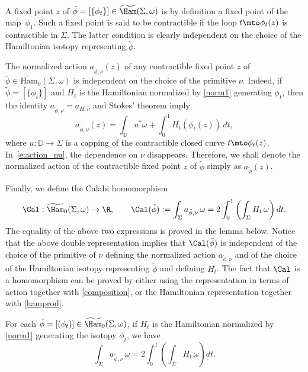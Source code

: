 A fixed point $z$ of $\tilde{\phi}=[\{\phi_t\}]\in \widetilde{\Ham}(\Sigma,\omega)$ is by definition a fixed point of the map~$\phi_1$. Such a fixed point is said to be contractible if the loop $t\mto \phi_t(z)$ is contractible in $\Sigma$. The latter condition is clearly independent on the choice of the Hamiltonian isotopy representing $\tilde{\phi}$.

The normalized action $a_{\tilde{\phi},\nu}(z)$ of any contractible fixed point $z$ of $\tilde{\phi}\in \widetilde{\mathrm{Ham}}_0(\Sigma,\omega)$ is independent on the choice of the primitive $\nu$. Indeed, if $\tilde\phi=[\{\phi_t\}]$ and $H_t$ is the Hamiltonian normalized by \eqref{norm1} generating $\phi_t$, then the identity $a_{\tilde{\phi},\nu}=a_{H,\nu}$ and Stokes' theorem imply
\begin{equation}
\label{e:action_nu}
a_{\tilde{\phi},\nu}(z) = \int_{\mathbb{D}} u^* \omega + \int_0^1 H_t(\phi_t(z))\, dt,
\end{equation}
where $u: \mathbb{D}\to \Sigma$ is a capping of the contractible closed curve $t\mto \phi_t(z)$. In~\eqref{e:action_nu}, the dependence on $\nu$ disappears. Therefore, we shall denote the normalized action of the contractible fixed point $z$ of $\tilde{\phi}$ simply as $a_{\tilde{\phi}}(z)$.

Finally, we define the Calabi homomorphism
\[
\Cal: \widetilde{\Ham}_0(\Sigma,\omega) \to \R,\qquad
\Cal(\tilde{\phi}) := \int_{\Sigma} a_{\tilde{\phi},\nu} \, \omega = 2 \int_0^1\left( \int_{\Sigma} H_t\, \omega \right) dt.
\]
The equality of the above two expressions is proved in the lemma below.
Notice that the above double representation implies that $\Cal(\tilde{\phi})$ is independent of the choice of the primitive of $\nu$ defining the normalized action $a_{\tilde{\phi},\nu}$ and of the choice of the Hamiltonian isotopy representing $\tilde{\phi}$ and defining $H_t$.
The fact that $\Cal$ is a homomorphism can be proved by either using the representation in terms of action together with \eqref{composition}, or the Hamiltonian representation together with \eqref{hamprod}.

\begin{lem}
\label{l:Calabi}
For each $\tilde{\phi}=[(\phi_t)]\in\widetilde{\Ham}_0(\Sigma,\omega)$, if $H_t$ is the Hamiltonian normalized by \eqref{norm1} generating the isotopy $\phi_t$, we have
\[
\int_{\Sigma} a_{\tilde{\phi},\nu} \, \omega = 2 \int_0^1\left( \int_{\Sigma} H_t\, \omega \right) dt.
\]
\end{lem}


